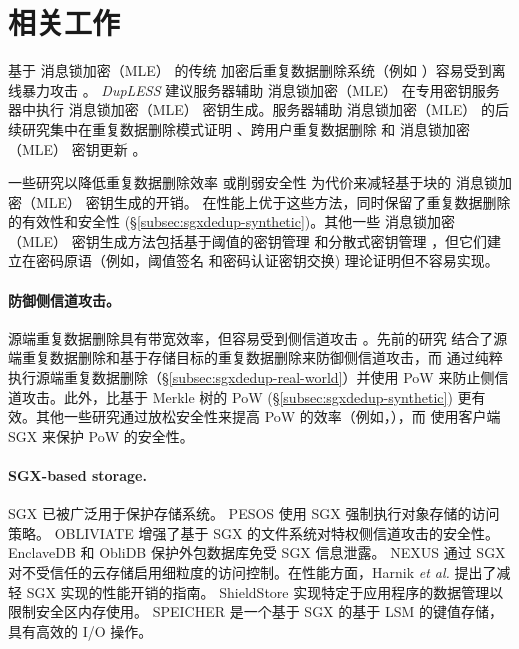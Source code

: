 \section{相关工作}
\label{sec:sgxdedup-related_work}

 基于 消息锁加密（MLE） 的传统 \cite{bellare2013MLE} 加密后重复数据删除系统（例如 \cite{adya2002farsite,cox2002pastiche,shah15}）容易受到离线暴力攻击 \cite{bellare2013DupLESS}。 {\em DupLESS} \cite{bellare2013DupLESS} 建议服务器辅助 消息锁加密（MLE） 在专用密钥服务器中执行 消息锁加密（MLE） 密钥生成。服务器辅助 消息锁加密（MLE） 的后续研究集中在重复数据删除模式证明 \cite{armknecht2015transparent}、跨用户重复数据删除 \cite{zhou2015secdep} 和 消息锁加密（MLE） 密钥更新 \cite{qin17}。

一些研究以降低重复数据删除效率 \cite{zhou2015secdep,qin17} 或削弱安全性 \cite{li2020Info} 为代价来减轻基于块的 消息锁加密（MLE） 密钥生成的开销。 \sysnameS 在性能上优于这些方法，同时保留了重复数据删除的有效性和安全性 (\S\ref{subsec:sgxdedup-synthetic})。其他一些 消息锁加密（MLE） 密钥生成方法包括基于阈值的密钥管理 \cite{duan2014distributed} 和分散式密钥管理 \cite{liu2015secure}，但它们建立在密码原语（例如，阈值签名 \cite{duan2014distributed} 和密码认证密钥交换\cite{liu2015secure}) 理论证明但不容易实现。

\paragraph*{防御侧信道攻击。} 源端重复数据删除具有带宽效率，但容易受到侧信道攻击 \cite{harnik2010side}。先前的研究 \cite{harnik2010side, li15} 结合了源端重复数据删除和基于存储目标的重复数据删除来防御侧信道攻击，而 \sysnameS 通过纯粹执行源端重复数据删除（\S\ref{subsec:sgxdedup-real-world}）并使用 PoW 来防止侧信道攻击。此外，\sysnameS 比基于 Merkle 树的 PoW (\S\ref{subsec:sgxdedup-synthetic}) 更有效。其他一些研究通过放松安全性来提高 PoW 的效率（例如，\cite{pietro12,xu2013weak}），而 \sysnameS 使用客户端 SGX 来保护 PoW 的安全性。

\paragraph*{SGX-based storage.} SGX \cite{sgx} 已被广泛用于保护存储系统。 PESOS \cite{krahn2018PESOS} 使用 SGX 强制执行对象存储的访问策略。 OBLIVIATE \cite{ahmad2018OBLIVIATE} 增强了基于 SGX 的文件系统对特权侧信道攻击的安全性。 EnclaveDB \cite{priebe18} 和 ObliDB \cite{eskandarian19} 保护外包数据库免受 SGX 信息泄露。 NEXUS \cite{djoko2019NEXUS} 通过 SGX 对不受信任的云存储启用细粒度的访问控制。在性能方面，Harnik \textit{ et al.} \cite{harnik18} 提出了减轻 SGX 实现的性能开销的指南。 ShieldStore \cite{kim2019ShieldStore} 实现特定于应用程序的数据管理以限制安全区内存使用。 SPEICHER \cite{bailleu2019SPEICHER} 是一个基于 SGX 的基于 LSM 的键值存储，具有高效的 I/O 操作。

